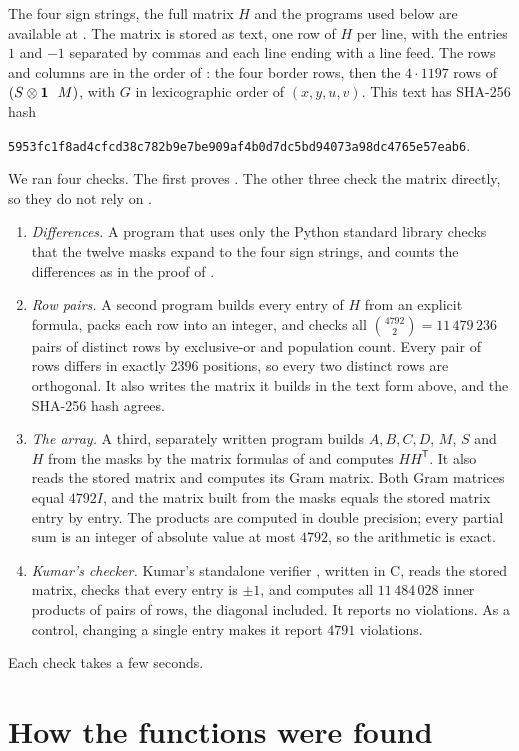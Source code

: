 \documentclass[11pt,colorlinks]{charlie}
\newcommand{\T}{\mathsf T}
\begin{document}
The four sign strings, the full matrix $H$ and the programs used below are available at \coderepo. The matrix is stored as text, one row of $H$ per line, with the entries $1$ and $-1$ separated by commas and each line ending with a line feed. The rows and columns are in the order of : the four border rows, then the $4\cdot1197$ rows of $(S\otimes\mathbf{1}\ \ M)$, with $G$ in lexicographic order of $(x,y,u,v)$. This text has SHA-256 hash
\begin{center}\footnotesize
\texttt{5953fc1f8ad4cfcd38c782b9e7be909af4b0d7dc5bd94073a98dc4765e57eab6}.
\end{center}
We ran four checks. The first proves . The other three check the matrix directly, so they do not rely on .
\begin{enumerate}
\item \emph{Differences.} A program that uses only the Python standard library checks that the twelve masks expand to the four sign strings, and counts the differences as in the proof of .
\item \emph{Row pairs.} A second program builds every entry of $H$ from an explicit formula, packs each row into an integer, and checks all $\binom{4792}{2}=11\,479\,236$ pairs of distinct rows by exclusive-or and population count. Every pair of rows differs in exactly $2396$ positions, so every two distinct rows are orthogonal. It also writes the matrix it builds in the text form above, and the SHA-256 hash agrees.
\item \emph{The array.} A third, separately written program builds $A,B,C,D$, $M$, $S$ and $H$ from the masks by the matrix formulas of  and computes $HH^{\T}$. It also reads the stored matrix and computes its Gram matrix. Both Gram matrices equal $4792I$, and the matrix built from the masks equals the stored matrix entry by entry. The products are computed in double precision; every partial sum is an integer of absolute value at most $4792$, so the arithmetic is exact.
\item \emph{Kumar's checker.} Kumar's standalone verifier \cite{Kumar}, written in C, reads the stored matrix, checks that every entry is $\pm1$, and computes all $11\,484\,028$ inner products of pairs of rows, the diagonal included. It reports no violations. As a control, changing a single entry makes it report $4791$ violations.
\end{enumerate}
Each check takes a few seconds.

\section{How the functions were found}\label{sec:search}
\end{document}
